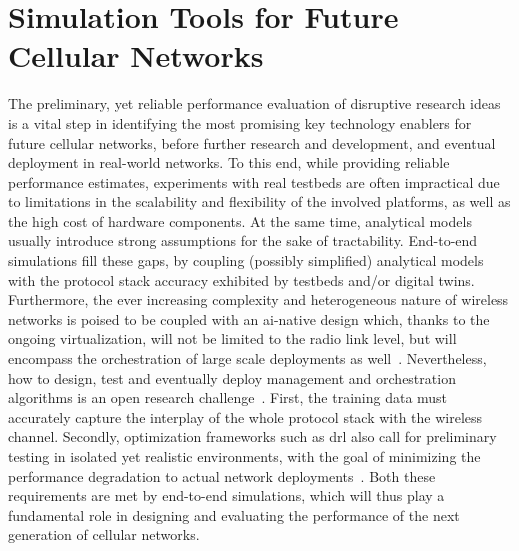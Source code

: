 \chapter{Simulation Tools for Future Cellular Networks}
\label{ch:sim-tools}

The preliminary, yet reliable performance evaluation of disruptive research ideas is a vital step in identifying the most promising key technology enablers for future cellular networks, before further research and development, and eventual deployment in real-world networks.
To this end, while providing reliable performance estimates, experiments with real testbeds are often impractical due to limitations in the scalability and flexibility of the involved platforms, as well as the high cost of hardware components. At the same time, analytical models usually introduce strong assumptions for the sake of tractability. End-to-end simulations fill these gaps, by coupling (possibly simplified) analytical models with the protocol stack accuracy exhibited by testbeds and/or digital twins.
Furthermore, the ever increasing complexity and heterogeneous nature of wireless networks is poised to be coupled with an \gls{ai}-native design which, thanks to the ongoing virtualization, will not be limited to the radio link level, but will encompass the orchestration of large scale deployments as well~\cite{polese2023understanding}.
Nevertheless, how to design, test and eventually deploy management and orchestration algorithms is an open research challenge~\cite{polese2022colo}.
First, the training data must accurately capture the interplay of the whole protocol stack with the wireless channel. Secondly, optimization frameworks such as \gls{drl} also call for preliminary testing in isolated yet realistic environments, with the goal of minimizing the performance degradation to actual network deployments~\cite{lacava2022programmable, amir2023safehaul}.
Both these requirements are met by end-to-end simulations, which will thus play a fundamental role in designing and evaluating the performance of the next generation of cellular networks.


